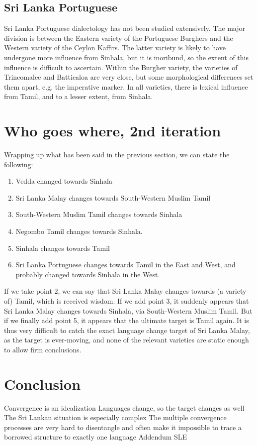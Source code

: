 \documentclass[handout,utf8]{article}
\begin{document}
\subsection{Sri Lanka Portuguese}
Sri Lanka Portuguese dialectology has not been studied extensively. The major division is between the Eastern variety of the Portuguese Burghers and the Western variety of the Ceylon Kaffirs. The latter variety is likely to have undergone more influence from Sinhala, but it is moribund, so the extent of this influence is difficult to ascertain. Within the Burgher variety, the varieties of Trincomalee and Batticaloa are very close, but some morphological differences set them apart, e.g. the imperative marker. In all varieties, there is lexical influence from Tamil, and to a lesser extent, from Sinhala. 

\section{Who goes where, 2nd iteration}
Wrapping up what has been said in the previous section, we can state the following:

\begin{enumerate}
 \item Vedda changed towards Sinhala
 \item Sri Lanka Malay changes towards South-Western Muslim Tamil 
 \item South-Western Muslim Tamil changes towards Sinhala
 \item Negombo Tamil changes towards Sinhala. 
 \item Sinhala changes towards Tamil 
 \item Sri Lanka Portuguese changes towards Tamil in the East and West, and probably changed towards Sinhala in the West.
\end{enumerate}

If we take point 2, we can say that Sri Lanka Malay changes towards (a variety of) Tamil, which is received wisdom. If we add point 3, it suddenly appears that Sri Lanka Malay changes towards Sinhala, via South-Western Muslim Tamil. But if we finally add point 5, it appears that the ultimate target is Tamil again. It is thus very difficult to catch the exact language change target of Sri Lanka Malay, as the target is ever-moving, and none of the relevant varieties are static enough to allow firm conclusions. 





\section{Conclusion}
        Convergence is an idealization
        Languages change, so the target changes as well
        The Sri Lankan situation is especially complex
        The multiple convergence processes are very hard to disentangle and often make it impossible to trace a borrowed structure to exactly one language
    Addendum
        SLE
\end{document}
